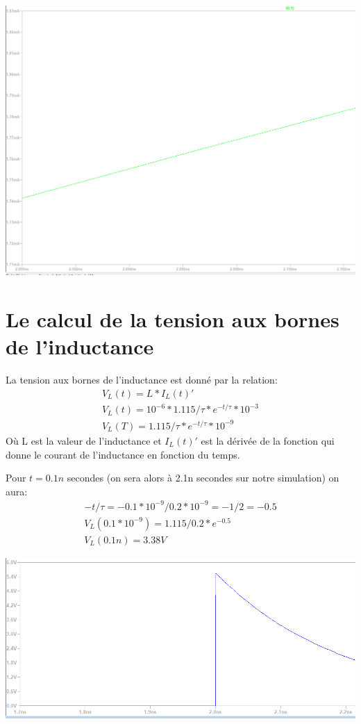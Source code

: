 \documentclass{homeworg}
\begin{document}
\begin{center}
    \includegraphics[scale=0.35]{CurentPoint.PNG}
\end{center}

\newpage
\section{Le calcul de la tension aux bornes de l'inductance}
    La tension aux bornes de l'inductance est donné par la relation:
    \begin{align}
        V_L(t) = L * I_L(t)'\\
        V_L(t) = 10^{-6} * 1.115/\tau * e^{-t/\tau} * 10^{-3}\\
        V_L(T) = 1.115/\tau * e^{-t/\tau} * 10^{-9} 
    \end{align}
    Où L est la valeur de l'inductance et $I_L(t)'$ est la dérivée de la fonction qui donne le courant de l'inductance en fonction du temps.
    
    Pour $t=0.1n$ secondes (on sera alors à 2.1n secondes sur notre simulation) on aura:
    \begin{align}
        -t / \tau = -0.1 * 10^{-9} / 0.2 * 10^{-9} = -1/2 = -0.5\\
        V_L(0.1 * 10^{-9}) = 1.115/0.2 * e^{-0.5}\\
        V_L(0.1n) = 3.38V
    \end{align}
    \begin{center}
        \includegraphics[scale=0.6]{VoltagePoint.PNG}
    \end{center}
\newpage
\end{document}
